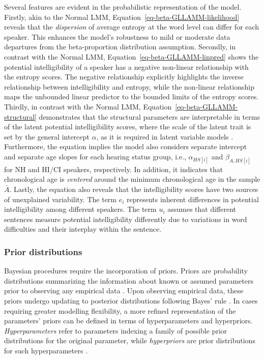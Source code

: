 \documentclass[
  authoryear,
  preprint,
  1p]{elsarticle}
\begin{document}
Several features are evident in the probabilistic representation of the
model. Firstly, akin to the Normal LMM,
Equation~\ref{eq-beta-GLLAMM-likelihood} reveals that the
\emph{dispersion} of average entropy at the word level can differ for
each speaker. This enhances the model's robustness to mild or moderate
data departures from the beta-proportion distribution assumption.
Secondly, in contrast with the Normal LMM,
Equation~\ref{eq-beta-GLLAMM-linpred} shows the potential
intelligibility of a speaker has a negative non-linear relationship with
the entropy scores. The negative relationship explicitly highlights the
inverse relationship between intelligibility and entropy, while the
non-linear relationship maps the unbounded linear predictor to the
bounded limits of the entropy scores. Thirdly, in contrast with the
Normal LMM, Equation~\ref{eq-beta-GLLAMM-structural} demonstrates that
the structural parameters are interpretable in terms of the latent
potential intelligibility scores, where the scale of the latent trait is
set by the general intercept \(\alpha\), as it is required in latent
variable models \citep{Depaoli_2021}. Furthermore, the equation implies
the model also considers separate intercept and separate age slopes for
each hearing status group, i.e., \(\alpha_{HS[i]}\) and
\(\beta_{A, HS[i]}\) for NH and HI/CI speakers, respectively. In
addition, it indicates that chronological age is \emph{centered} around
the minimum chronological age in the sample \(\bar{A}\). Lastly, the
equation also reveals that the intelligibility scores have two sources
of unexplained variability. The term \(e_{i}\) represents inherent
differences in potential intelligibility among different speakers. The
term \(u_{i}\) assumes that different sentences measure potential
intelligibility differently due to variations in word difficulties and
their interplay within the sentence.

\subsubsection{Prior distributions}\label{sec-M-SM-P}

Bayesian procedures require the incorporation of priors. Priors are
probability distributions summarizing the information about known or
assumed parameters prior to observing any empirical data
\citep{Everitt_et_al_2010}. Upon observing empirical data, these priors
undergo updating to posterior distributions following Bayes' rule
\citep{Jeffreys_1998}. In cases requiring greater modelling flexibility,
a more refined representation of the parameters' priors can be defined
in terms of hyperparameters and hyperpriors. \emph{Hyperparameters}
refer to parameters indexing a family of possible prior distributions
for the original parameter, while \emph{hyperpriors} are prior
distributions for such hyperparameters \citep{Everitt_et_al_2010}.
\end{document}
